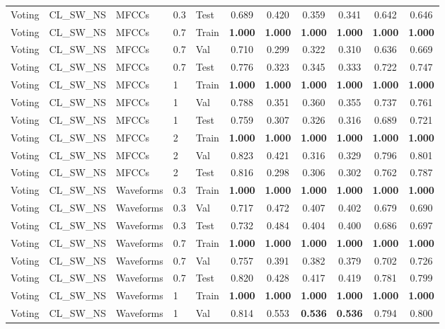 \begin{landscape}
\begin{longtable}{|l|l|l|l|l|c|c|c|c|c|c|}
Voting & CL\_SW\_NS & MFCCs & 0.3 & Test & 0.689 & 0.420 & 0.359 & 0.341 & 0.642 & 0.646 \\
Voting & CL\_SW\_NS & MFCCs & 0.7 & Train & \textbf{1.000} & \textbf{1.000} & \textbf{1.000} & \textbf{1.000} & \textbf{1.000} & \textbf{1.000} \\
Voting & CL\_SW\_NS & MFCCs & 0.7 & Val & 0.710 & 0.299 & 0.322 & 0.310 & 0.636 & 0.669 \\
Voting & CL\_SW\_NS & MFCCs & 0.7 & Test & 0.776 & 0.323 & 0.345 & 0.333 & 0.722 & 0.747 \\
Voting & CL\_SW\_NS & MFCCs & 1 & Train & \textbf{1.000} & \textbf{1.000} & \textbf{1.000} & \textbf{1.000} & \textbf{1.000} & \textbf{1.000} \\
Voting & CL\_SW\_NS & MFCCs & 1 & Val & 0.788 & 0.351 & 0.360 & 0.355 & 0.737 & 0.761 \\
Voting & CL\_SW\_NS & MFCCs & 1 & Test & 0.759 & 0.307 & 0.326 & 0.316 & 0.689 & 0.721 \\
Voting & CL\_SW\_NS & MFCCs & 2 & Train & \textbf{1.000} & \textbf{1.000} & \textbf{1.000} & \textbf{1.000} & \textbf{1.000} & \textbf{1.000} \\
Voting & CL\_SW\_NS & MFCCs & 2 & Val & 0.823 & 0.421 & 0.316 & 0.329 & 0.796 & 0.801 \\
Voting & CL\_SW\_NS & MFCCs & 2 & Test & 0.816 & 0.298 & 0.306 & 0.302 & 0.762 & 0.787 \\
Voting & CL\_SW\_NS & Waveforms & 0.3 & Train & \textbf{1.000} & \textbf{1.000} & \textbf{1.000} & \textbf{1.000} & \textbf{1.000} & \textbf{1.000} \\
Voting & CL\_SW\_NS & Waveforms & 0.3 & Val & 0.717 & 0.472 & 0.407 & 0.402 & 0.679 & 0.690 \\
Voting & CL\_SW\_NS & Waveforms & 0.3 & Test & 0.732 & 0.484 & 0.404 & 0.400 & 0.686 & 0.697 \\
Voting & CL\_SW\_NS & Waveforms & 0.7 & Train & \textbf{1.000} & \textbf{1.000} & \textbf{1.000} & \textbf{1.000} & \textbf{1.000} & \textbf{1.000} \\
Voting & CL\_SW\_NS & Waveforms & 0.7 & Val & 0.757 & 0.391 & 0.382 & 0.379 & 0.702 & 0.726 \\
Voting & CL\_SW\_NS & Waveforms & 0.7 & Test & 0.820 & 0.428 & 0.417 & 0.419 & 0.781 & 0.799 \\
Voting & CL\_SW\_NS & Waveforms & 1 & Train & \textbf{1.000} & \textbf{1.000} & \textbf{1.000} & \textbf{1.000} & \textbf{1.000} & \textbf{1.000} \\
Voting & CL\_SW\_NS & Waveforms & 1 & Val & 0.814 & 0.553 & \textbf{0.536} & \textbf{0.536} & 0.794 & 0.800 \\

\end{longtable}
\end{landscape}
